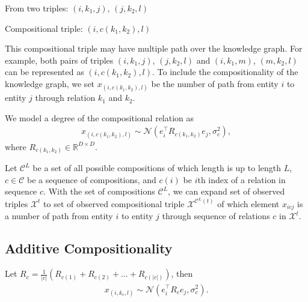 From two triples:
$(i, k_1 ,j)$,  $(j, k_2, l)$

Compositional triple:
$(i, {c}(k_1, k_2), l)$

This compositional triple may have multiple path over the knowledge graph. For example, both pairs of triples $(i, k_1 ,j)$,  $(j, k_2, l)$ and $(i, k_1 ,m)$,  $(m, k_2, l)$ can be represented as $(i, {c}(k_1, k_2), l)$. To include the compositionality of the knowledge graph, we set  $x_{(i, {{c}(k_1, k_2)}, l)}$ be the number of path from entity $i$ to entity $j$ through relation $k_1$ and $k_2$.

We model a degree of the compositional relation as
\begin{align}
x_{(i, {{c}(k_1, k_2)}, l)} \sim \mathcal{N}(e_i^\top R_{{c}(k_1,k_2)} e_j, \sigma_{c}^2),
\end{align}
where $R_{{c}(k_1,k_2)} \in \mathbb{R}^{D\times D}$.

Let $\mathcal{C}^{L}$ be a set of all possible compositions of which length is up to length $L$, $c \in \mathcal{C}$ be a sequence of compositions, and $c(i)$ be $i$th index of a relation in sequence $c$. With the set of compositions $\mathcal{C}^{L}$, we can expand set of observed triples $\mathcal{X}^{t}$ to set of observed compositional triple $\mathcal{X}^{\mathcal{C}^{L}(t)}$ of which element $x_{icj}$ is a number of path from entity $i$ to entity $j$ through sequence of relations $c$ in $\mathcal{X}^{t}$.

\subsection{Additive Compositionality}
Let $R_{{c}} = \frac{1}{|c|}(R_{c(1)} + R_{c(2)} + \dots + R_{c(|c|)})$, then
\begin{align}
x_{(i, k_{{c}}, l)} \sim \mathcal{N}(e_i^\top R_c e_j, \sigma_{c}^2).
\end{align}

